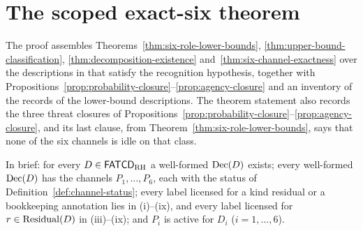 \section{The scoped exact-six theorem}\label{sec:scoped-exact-six}



The proof assembles Theorems~\ref{thm:six-role-lower-bounds},
\ref{thm:upper-bound-classification},
\ref{thm:decomposition-existence} and~\ref{thm:six-channel-exactness}
over the descriptions in \FATCD{} that satisfy the recognition hypothesis,
together with Propositions~\ref{prop:probability-closure}--\ref{prop:agency-closure}
and an inventory of the records of the lower-bound descriptions.
The theorem statement also records the three threat closures
of Propositions~\ref{prop:probability-closure}--\ref{prop:agency-closure},
and its last clause, from Theorem~\ref{thm:six-role-lower-bounds}, says that
none of the six channels is idle on that class.

In brief: for every \(D\in\mathsf{FATCD}_{\mathrm{RH}}\) a well-formed \(\operatorname{Dec}\!\left(D\right)\) exists; every well-formed \(\operatorname{Dec}\!\left(D\right)\) has the channels \(P_1,\ldots,P_6\), each with the status of Definition~\ref{def:channel-status}; every label licensed for a kind residual or a bookkeeping annotation lies in (i)--(ix), and every label licensed for \(r\in\operatorname{Residual}\!\left(D\right)\) in (iii)--(ix); and \(P_i\) is active for \(D_i\) (\(i=1,\ldots,6\)).

